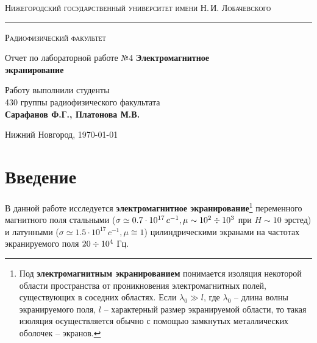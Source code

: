 \documentclass[a4paper,12pt]{article}
\def\labauthor{Сарафанов Ф.Г., Платонова М.В.}
\def\labnumber{4}
\def\labtheme{Электромагнитное \\[0.4em] экранирование}
\begin{document}
\begin{titlepage}

\begin{center}

{\textsc{Нижегородский государственный университет имени Н.\,И. Лобачевского}}
\vskip 2pt \hrule \vskip 3pt
{\textsc{Радиофизический факультет}}

\vfill


{{\LARGE Отчет по лабораторной работе №\labnumber}\vskip 12pt {\Huge \bfseries \labtheme}}

	
\vspace{2cm}
{\large Работу выполнили студенты \\[-0.25em] 430 группы радиофизического факультата \\[0.5em] {\Large \bfseries \labauthor}}



\end{center}

\vfill
	
	
	
\begin{center}
	{Нижний Новгород, \today}
\end{center}

\end{titlepage}

\tableofcontents
\newpage

\section*{Введение}
\label{sec:input}

В данной работе исследуется \textbf{электромагнитное экранирование}\footnote{Под \textbf{электромагнитным экранированием} понимается изоляция некоторой области пространства от проникновения электромагнитных полей, существующих в соседних областях. Если $\lambda_0\gg l$, где $\lambda_0$ -- длина волны экранируемого поля, $l$ -- характерный размер экранируемой области, то такая изоляция осуществляется обычно с помощью замкнутых металлических оболочек -- экранов.} переменного магнитного поля стальными ($\sigma \simeq 0.7\cdot 10^{17} \,c^{-1}, \mu \sim 10^2 \divisionsymbol 10^3 $ при $H \sim 10$ эрстед) и латунными ($\sigma \simeq 1.5\cdot 10^{17}\, c^{-1}, \mu \cong 1$) цилиндрическими экранами на частотах экранируемого поля $20\divisionsymbol10^4$ Гц.  
\end{document}
